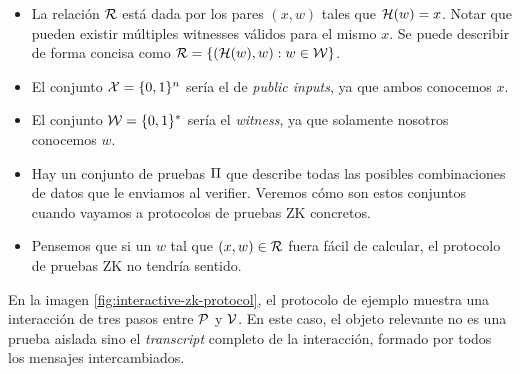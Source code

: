 \begin{itemize}[noitemsep]
	\item La relación $\mathcal{R}$ está dada por los pares $(x,w)$ tales que $\mathcal{H}(w) = x$. Notar que pueden existir múltiples witnesses válidos para el mismo $x$. Se puede describir de forma concisa como $\mathcal{R} = \{(\mathcal{H}(w), w): w \in \mathcal{W}\}$.
	\item El conjunto $\mathcal{X} = \{0,1\}^{n}$ sería el de \textit{public inputs}, ya que ambos conocemos $x$.
	\item El conjunto $\mathcal{W} = \{0,1\}^{*}$ sería el \textit{witness}, ya que solamente nosotros conocemos $w$.
	\item Hay un conjunto de pruebas $\Pi$ que describe todas las posibles combinaciones de datos que le enviamos al verifier. Veremos cómo son estos conjuntos cuando vayamos a protocolos de pruebas ZK concretos.
	\item Pensemos que si un $w$ tal que $(x,w) \in \mathcal{R}$ fuera fácil de calcular, el protocolo de pruebas ZK no tendría sentido.
\end{itemize}

En la imagen \ref{fig:interactive-zk-protocol}, el protocolo de ejemplo muestra una interacción de tres pasos entre $\mathcal{P}$ y $\mathcal{V}$. En este caso, el objeto relevante no es una prueba aislada sino el \textit{transcript} completo de la interacción, formado por todos los mensajes intercambiados.

